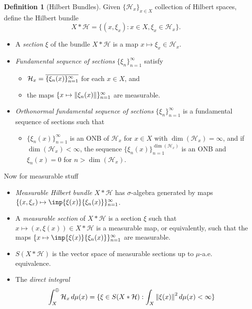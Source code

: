 \documentclass[12pt]{article}
\renewcommand{\H}{\mathcal{H}}
\let\Span\relax
\DeclareMathOperator{\Span}{Span}
\newcommand*\cls[1]{\overline{#1}}
\theoremstyle{definition}
\newtheorem{definition}{Definition}[]
\theoremstyle{plain}
\theoremstyle{remark}
\begin{document}
\begin{definition}[Hilbert Bundles]
    Given $ \{\H_{x}\}_{x\in X} $ collection of Hilbert spaces, define the Hilbert bundle
    \[
        X\ast \H = \{(x,\xi_{x}) : x\in X, \xi_{x}\in\H_{x}\}.
    \]
    \begin{itemize}
        \item A \textit{section} $ \xi $ of the bundle $ X\ast \H $ is a map $ x\mapsto \xi_{x}\in \H_{x} $.
        \item \textit{Fundamental sequence of sections} $ \{\xi_{n}\}_{n=1}^{\infty} $ satisfy
        \begin{itemize}
            \item $ \H_{x} = \cls{\Span\{\xi_{n}(x)\}_{n=1}^{\infty}} $ for each $ x\in X $, and
            \item the maps $ \{x\mapsto \norm{\xi_{n}(x)}\}_{n=1}^{\infty} $ are measurable.
        \end{itemize}
        \item \textit{Orthonormal fundamental sequence of sections} $ \{\xi_{n}\}_{n=1}^{\infty} $ is a fundamental sequence of sections such that
        \begin{itemize}
            \item $ \{\xi_{n}(x)\}_{n=1}^{\infty} $ is an ONB of $ \H_{x} $ for $ x\in X $ with $ \dim(\H_{x}) = \infty $, and if $ \dim(\H_{x})<\infty $, the sequence $ \{\xi_{n}(x)\}_{n=1}^{\dim(\H_{x})} $ is an ONB and $ \xi_{n}(x) = 0 $ for $ n>\dim(\H_{x}) $.
        \end{itemize}
    \end{itemize}
    Now for measurable stuff
    \begin{itemize}
        \item \textit{Measurable Hilbert bundle} $ X\ast \H $ has $ \sigma $-algebra generated by maps $ \{(x,\xi_{x}) \mapsto \inp{\xi(x)}{\xi_{n}(x)}\}_{n=1}^{\infty} $.
        \item A \textit{measurable section} of $ X\ast \H $ is a section $ \xi $ such that $ x\mapsto (x,\xi(x)) \in X\ast \H $ is a measurable map, or equivalently, such that the maps $ \{x\mapsto \inp{\xi(x)}{\xi_{n}(x)}\}_{n=1}^{\infty} $ are measurable.
        \item $ S(X\ast\H) $ is the vector space of measurable sections up to $ \mu $-a.e. equivalence.
        \item The \textit{direct integral}
            \[
                \int_{X}^{\oplus} \H_{x}\dd{\mu(x)} = \{\xi\in S(X\ast\H) : \int_{X}\norm{\xi(x)}^{2}\dd{\mu(x)}<\infty\}
\]
\end{itemize}
\end{definition}
\end{document}
